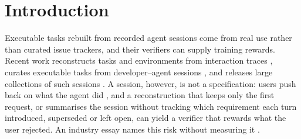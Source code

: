 \section{Introduction}
\label{sec:intro}
Executable tasks rebuilt from recorded agent sessions come from real use rather than curated issue trackers, and their verifiers can supply training rewards. Recent work reconstructs tasks and environments from interaction traces \cite{trace2eval}, curates executable tasks from developer--agent sessions \cite{swetogether,lu2026harvesting}, and releases large collections of such sessions \cite{swechat}. A session, however, is not a specification: users push back on what the agent did \cite{swechat}, and a reconstruction that keeps only the first request, or summarises the session without tracking which requirement each turn introduced, superseded or left open, can yield a verifier that rewards what the user rejected. An industry essay names this risk without measuring it \cite{guo2026production}.

